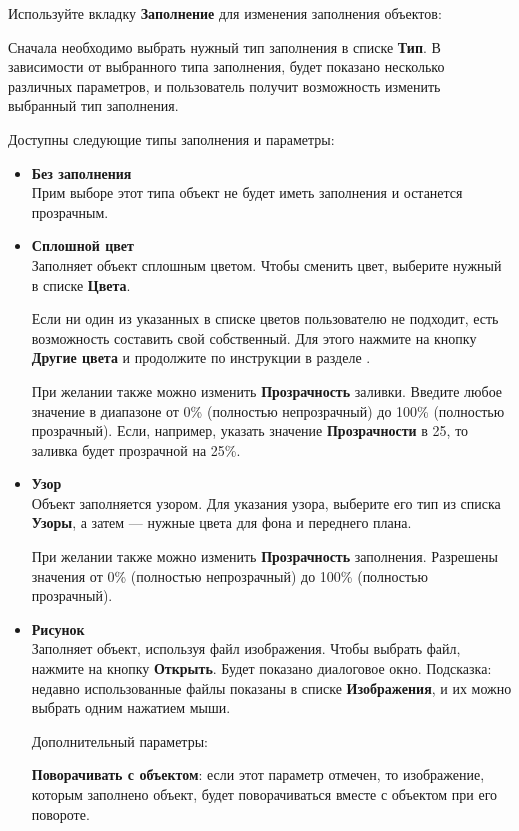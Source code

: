 ﻿\documentclass[a4paper,10pt]{article}
\begin{document}
 Используйте вкладку \textbf{Заполнение} для изменения заполнения объектов:
 
 Сначала необходимо выбрать нужный тип заполнения в списке \textbf{Тип}. В зависимости от выбранного типа заполнения, будет показано несколько различных параметров, и пользователь получит возможность изменить выбранный тип заполнения.
 
 Доступны следующие типы заполнения и параметры:
 \begin{itemize}
  \item \textbf{Без заполнения}\\
  Прим выборе этот типа объект не будет иметь заполнения и останется прозрачным.
  \item \textbf{Сплошной цвет}\\
  Заполняет объект сплошным цветом. Чтобы сменить цвет, выберите нужный в списке \textbf{Цвета}.
  
  Если ни один из указанных в списке цветов пользователю не подходит, есть возможность составить свой собственный. Для этого нажмите на кнопку \textbf{Другие цвета} и продолжите по инструкции в разделе .
  
  При желании также можно изменить \textbf{Прозрачность} заливки. Введите любое значение в диапазоне от 0\% (полностью непрозрачный) до 100\% (полностью прозрачный). Если, например, указать значение \textbf{Прозрачности} в 25, то заливка будет прозрачной на 25\%.
  \item \textbf{Узор}\\
  Объект заполняется узором. Для указания узора, выберите его тип из списка \textbf{Узоры}, а затем — нужные цвета для фона и переднего плана.
  
  При желании также можно изменить \textbf{Прозрачность} заполнения. Разрешены значения от 0\% (полностью непрозрачный) до 100\% (полностью прозрачный).
  \item \textbf{Рисунок}\\
  Заполняет объект, используя файл изображения. Чтобы выбрать файл, нажмите на кнопку \textbf{Открыть}. Будет показано диалоговое окно. Подсказка: недавно использованные файлы показаны в списке \textbf{Изображения}, и их можно выбрать одним нажатием мыши.
  
  Дополнительный параметры:
  
  \textbf{Поворачивать с объектом}: если этот параметр отмечен, то изображение, которым заполнено объект, будет поворачиваться вместе с объектом при его повороте. 
  

\end{itemize}
\end{document}
